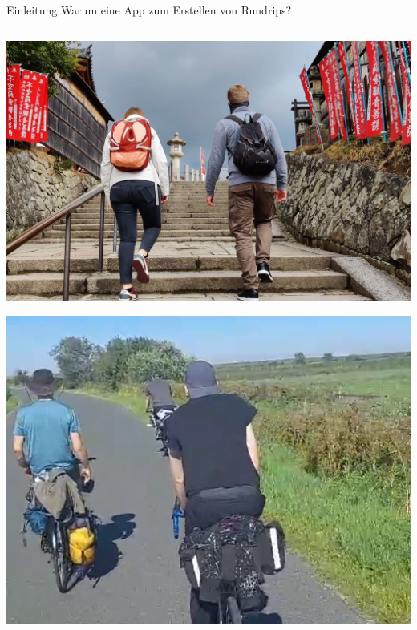 \documentclass[aspectratio=169,xcolor=dvipsnames, t]{beamer}
\begin{document}
	\begin{frame}{Einleitung}
		\vspace{0.25cm}
		Warum eine App zum Erstellen von Rundrips?
		\begin{columns}
			\begin{column}{0.48\textwidth}
				\includegraphics[height=0.3\textheight]{images/IMG-20231124-WA0010-cropped.jpg}
			\vspace{-1.5cm}
				\begin{flushright}
					\includegraphics[height=0.3\textheight]{images/IMG-20231124-WA0039-cropped.jpg}
				\end{flushright}
			\vspace{-1cm}
				\begin{flushleft}

\end{flushleft}
\end{column}
\end{columns}
\end{frame}
\end{document}
